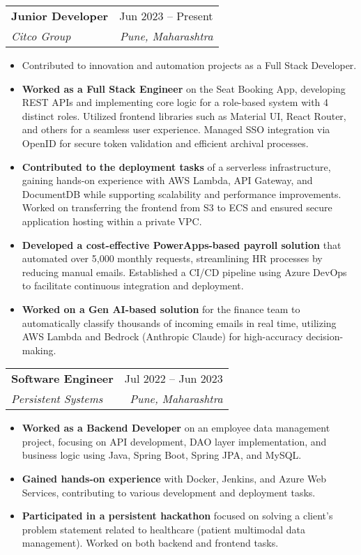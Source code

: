 \documentclass[letterpaper,11pt]{article}
\makeatletter
\newcommand{\resumeItem}[1]{
  \item\small{
    {#1 \vspace{-2pt}}
  }
}
\newcommand{\resumeSubheading}[4]{
  \vspace{-2pt}\item
    \begin{tabular*}{0.97\textwidth}[t]{l@{\extracolsep{\fill}}r}
      \textbf{#1} & #2 \\
      \textit{\small#3} & \textit{\small #4} \\
    \end{tabular*}\vspace{-7pt}
}
\newcommand{\resumeSubSubheading}[2]{
    \item
    \begin{tabular*}{0.97\textwidth}{l@{\extracolsep{\fill}}r}
      \textit{\small#1} & \textit{\small #2} \\
    \end{tabular*}\vspace{-7pt}
}
\newcommand{\resumeSubHeadingListEnd}{\end{itemize}}
\newcommand{\resumeItemListStart}{\begin{itemize}}
\newcommand{\resumeItemListEnd}{\end{itemize}\vspace{-5pt}}
\makeatother
\begin{document}
    \resumeSubheading
    {Junior Developer }{Jun 2023\textbf{ }  -- Present}
      {Citco Group }{Pune, Maharashtra}
      \resumeItemListStart
        \resumeItem{Contributed to innovation and automation projects as a Full Stack Developer. }
        \resumeItem{\textbf{Worked as a Full Stack Engineer} on the Seat Booking App, developing REST APIs and implementing core logic for a role-based system with 4 distinct roles. Utilized frontend libraries such as Material UI, React Router, and others for a seamless user experience. Managed SSO integration via OpenID for secure token validation and efficient archival processes. }
        \resumeItem{\textbf{Contributed to the deployment tasks} of a serverless infrastructure, gaining hands-on experience with AWS Lambda, API Gateway, and DocumentDB while supporting scalability and performance improvements. Worked on transferring the frontend from S3 to ECS and ensured secure application hosting within a private VPC. }
        \resumeItem{\textbf{Developed a cost-effective PowerApps-based payroll solution} that automated over 5,000 monthly requests, streamlining HR processes by reducing manual emails. Established a CI/CD pipeline using Azure DevOps to facilitate continuous integration and deployment.  }
                \resumeItem{\textbf{Worked on a Gen AI-based solution} for the finance team to automatically classify thousands of incoming emails in real time, utilizing AWS Lambda and Bedrock (Anthropic Claude) for high-accuracy decision-making.}
      \resumeItemListEnd
      

    \resumeSubheading
      {Software Engineer}{Jul 2022 -- Jun 2023 }
      {Persistent Systems}{Pune, Maharashtra}
      \resumeItemListStart
        \resumeItem{\textbf{Worked as a Backend Developer} on an employee data management project, focusing on API development, DAO layer implementation, and business logic using Java, Spring Boot, Spring JPA, and MySQL.  }
        \resumeItem{\textbf{Gained hands-on experience} with Docker, Jenkins, and Azure Web Services, contributing to various development and deployment tasks. }
        \resumeItem{\textbf{Participated in a persistent hackathon} focused on solving a client’s problem statement related to healthcare (patient multimodal data management). Worked on both backend and frontend tasks.}
    \resumeItemListEnd
\end{document}
